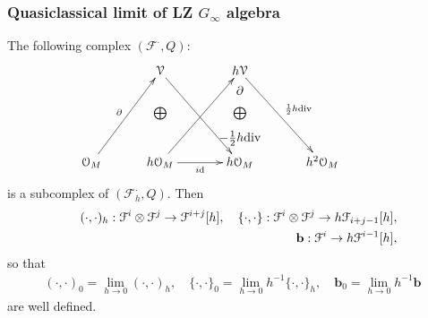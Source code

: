 \documentclass[9pt]{beamer}
\newcommand{\p}{\partial}
\def\cF{\mathcal{F}}
\begin{document}
\begin{frame}[t]
\frametitle{Quasiclassical limit of LZ $G_{\infty}$ algebra}
The following complex $(\mathcal{F}^{\cdot}, Q)$:
\begin{eqnarray*}
\xymatrixcolsep{30pt}
\xymatrixrowsep{3pt}
\xymatrix{
& \mathcal{V}\ar[ddddr] & h\mathcal{V}\ar[ddddr]^{\frac{1}{2}h{\rm div}}& \\
&& \p &&\\
& \bigoplus & \bigoplus & \\
&& {-\frac{1}{2}h{\rm div}} &&\\
\mathcal{O}_M\ar[uuuur]^{\p} & h\mathcal{O}_M\ar[uuuur]\ar[r]_{i\rm{d}} & h\mathcal{O}_M  & h^2\mathcal{O}_M
}
\end{eqnarray*}
is a subcomplex of 
$ (\mathcal{F}_h^{\cdot}, Q)$.
Then
\begin{eqnarray*}
&&(\cdot, \cdot)_h: \cF^i\otimes \cF^j\to \cF^{i+j}[h], 
\quad  \{\cdot,\cdot\}: \cF^i\otimes \cF^j\to h\cF_{i+j-1}[h],\\
&&{\bf b}: \cF^i\to h\cF^{i-1}[h], \nonumber
\end{eqnarray*}
so that 
\begin{eqnarray*}
(\cdot,\cdot)_0= \lim_{h\to 0}(\cdot,\cdot)_h, \quad 
\{\cdot,\cdot\}_0= \lim_{h\to 0}h^{-1}\{\cdot,\cdot\}_h, \quad \mathbf{b}_0=\lim_{h\to 0}h^{-1}\mathbf{b}
\end{eqnarray*}
are well defined. 


\end{frame}
\end{document}
